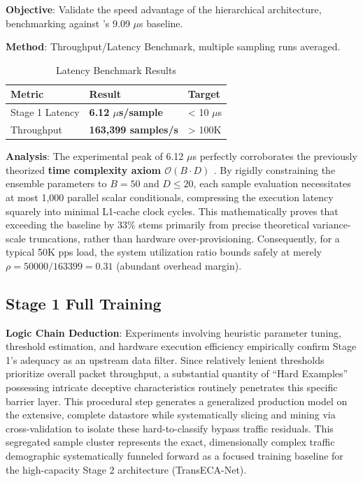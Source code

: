 \documentclass[sigconf]{acmart}
\begin{document}
\textbf{Objective}: Validate the speed advantage of the hierarchical architecture, benchmarking against \cite{7}'s 9.09 $\mu$s baseline.

\textbf{Method}: Throughput/Latency Benchmark, multiple sampling runs averaged.

\begin{table}[H]
\caption{Latency Benchmark Results}
\label{tab:latency}
\begin{tabular}{lll}
\toprule
\textbf{Metric} & \textbf{Result} & \textbf{Target} \\
\midrule
Stage 1 Latency & \textbf{6.12 $\mu$s/sample} & < 10 $\mu$s \\
Throughput & \textbf{163,399 samples/s} & > 100K \\
\bottomrule
\end{tabular}
\end{table}

\textbf{Analysis}: The experimental peak of 6.12 $\mu$s perfectly corroborates the previously theorized \textbf{time complexity axiom $\mathcal{O}(B \cdot D)$ \cite{3}}. By rigidly constraining the ensemble parameters to $B=50$ and $D \le 20$, each sample evaluation necessitates at most 1,000 parallel scalar conditionals, compressing the execution latency squarely into minimal L1-cache clock cycles. This mathematically proves that exceeding the \cite{7} baseline by 33\% stems primarily from precise theoretical variance-scale truncations, rather than hardware over-provisioning. Consequently, for a typical 50K pps load, the system utilization ratio bounds safely at merely $\rho = 50000/163399 = 0.31$ (abundant overhead margin).

\subsection{Stage 1 Full Training}
\textbf{Logic Chain Deduction}: Experiments involving heuristic parameter tuning, threshold estimation, and hardware execution efficiency empirically confirm Stage 1's adequacy as an upstream data filter. Since relatively lenient thresholds prioritize overall packet throughput, a substantial quantity of ``Hard Examples'' possessing intricate deceptive characteristics routinely penetrates this specific barrier layer. This procedural step generates a generalized production model on the extensive, complete datastore while systematically slicing and mining via cross-validation to isolate these hard-to-classify bypass traffic residuals. This segregated sample cluster represents the exact, dimensionally complex traffic demographic systematically funneled forward as a focused training baseline for the high-capacity Stage 2 architecture (TransECA-Net).
\end{document}
